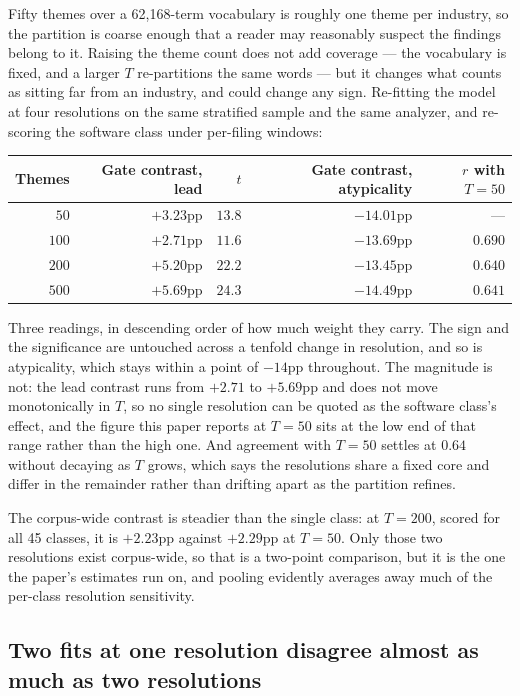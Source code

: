 Fifty themes over a 62,168-term vocabulary is roughly one theme per industry,
so the partition is coarse enough that a reader may reasonably suspect the
findings belong to it. Raising the theme count does not add coverage --- the
vocabulary is fixed, and a larger $T$ re-partitions the same words --- but it
changes what counts as sitting far from an industry, and could change any sign.
Re-fitting the model at four resolutions on the same stratified sample and the
same analyzer, and re-scoring the software class under per-filing windows:

\begin{center}\small
\begin{tabular}{rrrrr}
\toprule
Themes & Gate contrast, lead & $t$ & Gate contrast, atypicality & $r$ with $T=50$ \\
\midrule
$50$   & $+3.23$pp & $13.8$ & $-14.01$pp & --- \\
$100$  & $+2.71$pp & $11.6$ & $-13.69$pp & $0.690$ \\
$200$  & $+5.20$pp & $22.2$ & $-13.45$pp & $0.640$ \\
$500$  & $+5.69$pp & $24.3$ & $-14.49$pp & $0.641$ \\
\bottomrule
\end{tabular}
\end{center}

\noindent Three readings, in descending order of how much weight they carry.
The sign and the significance are untouched across a tenfold change in
resolution, and so is atypicality, which stays within a point of $-14$pp
throughout. The magnitude is not: the lead contrast runs from $+2.71$ to
$+5.69$pp and does not move monotonically in $T$, so no single resolution can
be quoted as the software class's effect, and the figure this paper reports at
$T = 50$ sits at the low end of that range rather than the high one. And
agreement with $T = 50$ settles at $0.64$ without decaying as $T$ grows, which
says the resolutions share a fixed core and differ in the remainder rather than
drifting apart as the partition refines.

The corpus-wide contrast is steadier than the single class: at $T = 200$,
scored for all 45 classes, it is $+2.23$pp against $+2.29$pp at $T = 50$. Only
those two resolutions exist corpus-wide, so that is a two-point comparison, but
it is the one the paper's estimates run on, and pooling evidently averages away
much of the per-class resolution sensitivity.

\subsection{Two fits at one resolution disagree almost as much as two resolutions}

